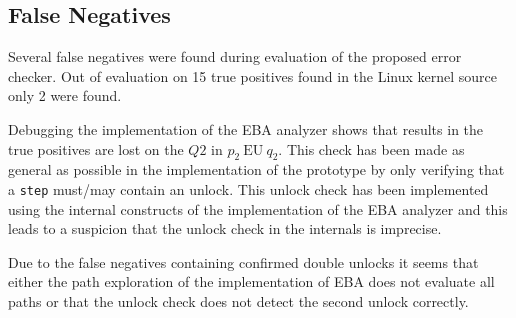 \subsection{False Negatives}

Several false negatives were found during evaluation of the proposed error checker. Out of evaluation on 15 true positives found in the Linux kernel source only 2 were found.

\newpar Debugging the implementation of the EBA analyzer shows that results in the true positives are lost on the $Q2$ in $p_2\:\mathrm{EU}\:q_2$. This check has been made as general as possible in the implementation of the prototype by only verifying that a \texttt{step} must/may contain an unlock. This unlock check has been implemented using the internal constructs of the implementation of the EBA analyzer and this leads to a suspicion that the unlock check in the internals is imprecise. 

\newpar Due to the false negatives containing confirmed double unlocks it seems that either the path exploration of the implementation of EBA does not evaluate all paths or that the unlock check does not detect the second unlock correctly.